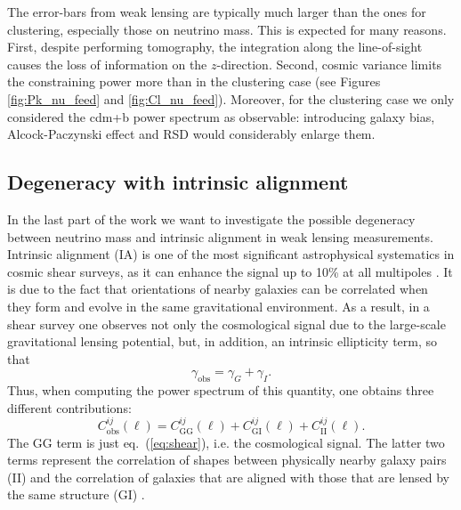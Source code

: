 \documentclass[a4paper,11pt]{article}
\newcommand{\eq}[1]{eq.~(\ref{#1})}
\begin{document}
The error-bars from weak lensing are typically much larger than the ones for clustering, especially those on neutrino mass.
This is expected for many reasons. First, despite performing tomography, the integration along the line-of-sight causes the loss of information on the $z$-direction.
Second, cosmic variance limits the constraining power more than in the clustering case (see Figures \ref{fig:Pk_nu_feed} and \ref{fig:Cl_nu_feed}). Moreover, for the clustering case we only considered the cdm+b power spectrum as observable: introducing galaxy bias, Alcock-Paczynski effect and RSD would considerably enlarge them.

\subsection{Degeneracy with intrinsic alignment}
\label{sec:intrinsic_alignment}

In the last part of the work we want to investigate the possible degeneracy between neutrino mass and intrinsic alignment in weak lensing measurements.
Intrinsic alignment (IA) is one of the most significant astrophysical systematics in cosmic shear surveys, as it can enhance the signal up to 10\% at all multipoles \cite{Troxel-IA+15}.
It is due to the fact that orientations of nearby galaxies can be correlated when they form and evolve in the same gravitational environment.
As a result, in a shear survey one observes not only the cosmological signal due to the large-scale gravitational lensing potential, but, in addition, an intrinsic ellipticity term, so that
\begin{equation}
\gamma_{\textrm{obs}} = \gamma_G+\gamma_I.
\end{equation}
Thus, when computing the power spectrum of this quantity, one obtains three different contributions:
\begin{equation}
C_{\textrm{obs}}^{ij}(\ell) = C_\mathrm{GG}^{ij}(\ell) + C_\mathrm{GI}^{ij}(\ell) + C_\mathrm{II}^{ij}(\ell).
\label{eq:shear_ia}
\end{equation}
The GG term is just \eq{eq:shear}, i.e. the cosmological signal.
The latter two terms represent the correlation of shapes between physically nearby galaxy pairs (II) \cite{Heavens-IA+00, Croft-IA+00} and the correlation of galaxies that are aligned with those that are lensed by the same structure (GI) \cite{Hirata-IA+04}.
\end{document}

